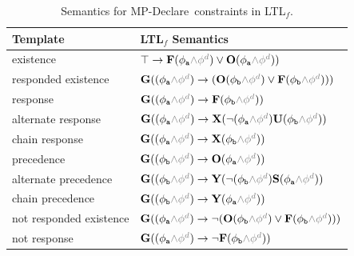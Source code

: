 \begin{table}[t!]
\caption{Semantics for MP-Declare\ constraints in LTL$_f$. \label{tbl:timed-mfotl}}
\centering
\scriptsize{
\begin{tabular}{ll}
\toprule
\textbf{Template} & \textbf{LTL$_f$ Semantics} \\
\midrule
existence & $\top \rightarrow \lfuture (\phi_{\texttt{a}} \textcolor{gray}{\wedge \phi^d}) \vee \lonce (\phi_{\texttt{a}} \textcolor{gray}{\wedge \phi^d}))$ \\
\midrule
responded existence  & $\lglobally( (\phi_{\texttt{a}} \textcolor{gray}{\wedge \phi^d}) \rightarrow (\lonce (\phi_{\texttt{b}} \textcolor{gray}{\wedge \phi^d}) \vee \lfuture (\phi_{\texttt{b}} \textcolor{gray}{\wedge \phi^d})))$ \\
\midrule
response &  $\lglobally(  (\phi_{\texttt{a}} \textcolor{gray}{\wedge \phi^d}) \rightarrow \lfuture (\phi_{\texttt{b}} \textcolor{gray}{\wedge \phi^d}))$ \\
alternate response  & $ \lglobally( (\phi_{\texttt{a}} \textcolor{gray}{\wedge \phi^d}) \rightarrow \lnext(\neg (\phi_{\texttt{a}} \textcolor{gray}{\wedge \phi^d}) \luntil (\phi_{\texttt{b}} \textcolor{gray}{\wedge \phi^d}))$ \\
chain response &  $\lglobally( (\phi_{\texttt{a}} \textcolor{gray}{\wedge \phi^d}) \rightarrow \lnext (\phi_{\texttt{b}} \textcolor{gray}{\wedge \phi^d}))$ \\
\midrule
precedence &  $\lglobally( (\phi_{\texttt{b}} \textcolor{gray}{\wedge \phi^d}) \rightarrow \lonce (\phi_{\texttt{a}} \textcolor{gray}{\wedge \phi^d}))$ \\
alternate precedence & $ \lglobally( (\phi_{\texttt{b}} \textcolor{gray}{\wedge \phi^d}) \rightarrow \lyesterday(\neg (\phi_{\texttt{b}} \textcolor{gray}{\wedge \phi^d}) \lsince (\phi_{\texttt{a}} \textcolor{gray}{\wedge \phi^d}))$ \\
chain precedence & $\lglobally( (\phi_{\texttt{b}} \textcolor{gray}{\wedge \phi^d}) \rightarrow \lyesterday (\phi_{\texttt{a}} \textcolor{gray}{\wedge \phi^d}))$ \\
\midrule
not responded existence  &
$\lglobally( (\phi_{\texttt{a}} \textcolor{gray}{\wedge \phi^d}) \rightarrow \neg (\lonce (\phi_{\texttt{b}}   \textcolor{gray}{\wedge \phi^d}) \vee \lfuture (\phi_{\texttt{b}} \textcolor{gray}{\wedge \phi^d})))$ \\
not response  & $\lglobally(  (\phi_{\texttt{a}} \textcolor{gray}{\wedge \phi^d}) \rightarrow \neg \lfuture (\phi_{\texttt{b}} \textcolor{gray}{\wedge \phi^d}))$ \\

\end{tabular}}
\end{table}
